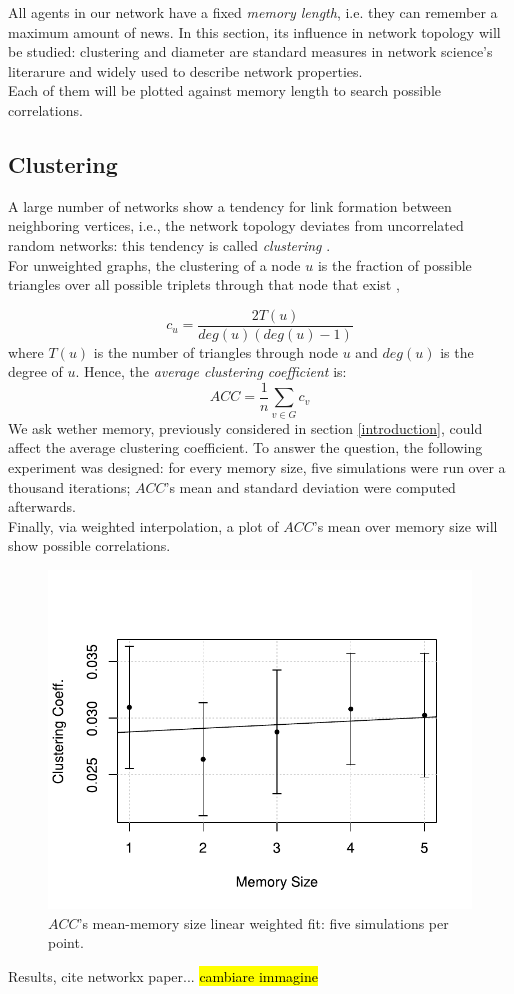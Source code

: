 All agents in our network have a fixed \textit{memory length}, i.e. they can remember a maximum
 amount of news.
In this section, its influence in network topology will be studied: clustering and
 diameter are standard measures in network science's literarure and widely used to describe 
 network properties.\\
  Each of them will be plotted 
 against memory length to search possible correlations.
\subsection{Clustering} \label{clustering}
A large number of networks show a tendency for link formation between neighboring vertices, 
i.e., the network topology deviates from uncorrelated random networks: this tendency is called 
\textit{clustering} \cite{clusterarticle}. \\
For unweighted graphs, the clustering of a node $u$ is the fraction of possible triangles over 
all possible triplets  through that node that exist \cite{clustersite},

\begin{equation}
\label{eq:clustering}
c_u = \frac{2 T(u)}{deg(u)(deg(u)-1)}
\end{equation}
where $T(u)$ is the number of triangles through node $u$ and $deg(u)$ is the degree of $u$.
Hence, the \textit{average clustering coefficient}  is:
\begin{equation}
\label{eq:average_clustering}
ACC = \frac{1}{n}\sum_{v \in G} c_v
\end{equation}
We ask wether memory, previously considered in section \ref{introduction}, could affect the 
average clustering coefficient.
To answer the question, the following experiment was designed:
for every memory size, five simulations were run over a thousand iterations; $ACC$'s mean and 
standard deviation were computed afterwards.\\
Finally, via weighted interpolation, a plot of $ACC$'s mean over memory size will show possible
 correlations.
\begin{figure}[h]
  \centering
  \includegraphics[trim={0cm 0cm 0cm 1cm},clip,width=.8\columnwidth]{img/clustering.pdf}
  \caption{$ACC$'s mean-memory size linear weighted fit: five simulations per point.}
  \label{fig:clustering}
\end{figure}
Results, cite networkx paper...
\hl{cambiare immagine}